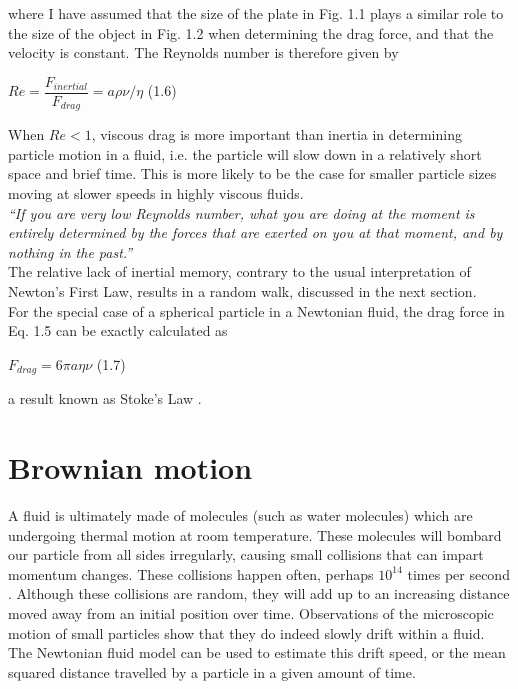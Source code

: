 where I have assumed that the size of the plate in Fig. 1.1 plays a similar role to the size of the object in Fig. 1.2 when determining the drag force, and that the velocity is constant.  The Reynolds number is therefore given by 


\vspace{7mm}
\hspace{52mm} $Re = \dfrac{F_{inertial}}{F_{drag}} = a \rho \nu / \eta$ \hspace*{0pt}\hfill (1.6) 
\vspace{7mm}

When $Re < 1$, viscous drag is more important than inertia in determining particle motion in a fluid, i.e. the particle will slow down in a relatively short space and brief time.  This is more likely to be the case for smaller particle sizes moving at slower speeds in highly viscous fluids. \\

\textit{“If you are very low Reynolds number, what you are doing at the moment is entirely determined by the forces that are exerted on you at that moment, and by nothing in the past.” \citep{Purcell}}\\ 

The relative lack of inertial memory, contrary to the usual interpretation of Newton’s First Law, results in a random walk, discussed in the next section. \\ 

For the special case of a spherical particle in a Newtonian fluid, the drag force in Eq. 1.5 can be exactly calculated as

\vspace{7mm}
\hspace{62mm} $F_{drag} = 6\pi a \eta \nu $ \hspace*{0pt}\hfill (1.7) 
\vspace{7mm}

a result known as Stoke’s Law \citep{Feynman}.

\vspace{7mm}

\section{Brownian motion}

A fluid is ultimately made of molecules (such as water molecules) which are undergoing thermal motion at room temperature.  These molecules will bombard our particle from all sides irregularly, causing small collisions that can impart momentum changes. These collisions happen often, perhaps $10^{14}$ times per second \citep{Reif}. Although these collisions are random, they will add up to an increasing distance moved away from an initial position over time. Observations of the microscopic motion of small particles show that they do indeed slowly drift within a fluid.  The Newtonian fluid model can be used to estimate this drift speed, or the mean squared distance travelled by a particle in a given amount of time. \\

